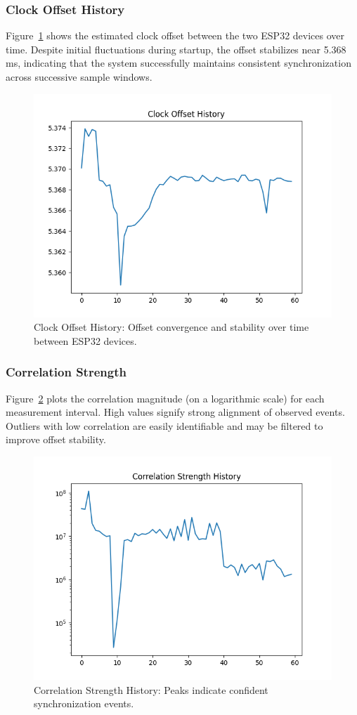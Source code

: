 \documentclass[sigconf]{acmart}
\begin{document}
\subsubsection{Clock Offset History}
Figure~\ref{fig:offset-history} shows the estimated clock offset between the two ESP32 devices over time. Despite initial fluctuations during startup, the offset stabilizes near 5.368 ms, indicating that the system successfully maintains consistent synchronization across successive sample windows.

\begin{figure}[H]
    \centering
    \includegraphics[width=0.8\linewidth]{offset_history.png}
    \caption{Clock Offset History: Offset convergence and stability over time between ESP32 devices.}
    \label{fig:offset-history}
\end{figure}

\subsubsection{Correlation Strength}
Figure~\ref{fig:correlation-history} plots the correlation magnitude (on a logarithmic scale) for each measurement interval. High values signify strong alignment of observed events. Outliers with low correlation are easily identifiable and may be filtered to improve offset stability.

\begin{figure}[H]
    \centering
    \includegraphics[width=0.8\linewidth]{correlation_history.png}
    \caption{Correlation Strength History: Peaks indicate confident synchronization events.}
    \label{fig:correlation-history}
\end{figure}
\end{document}
